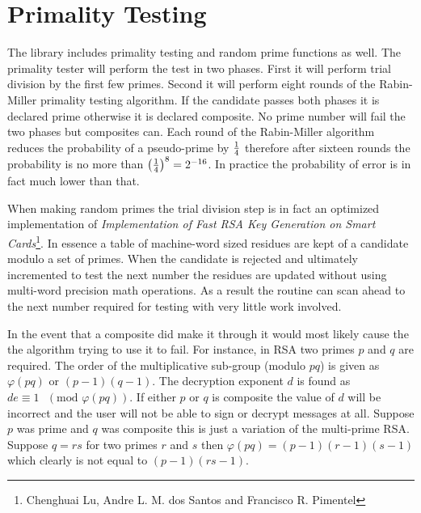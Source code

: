 \documentclass[synpaper]{book}
\def\phi{\varphi}
\newcommand{\mysection}[1]    %
	{                   %
	\section{#1}
   \markboth{\textsf{www.libtom.org}}{\thesection ~ {#1}}
	}
\begin{document}
\mysection{Primality Testing}
The library includes primality testing and random prime functions as well.  The primality tester will perform the test in
two phases.  First it will perform trial division by the first few primes.  Second it will perform eight rounds of the
Rabin-Miller primality testing algorithm.  If the candidate passes both phases it is declared prime otherwise it is declared
composite.  No prime number will fail the two phases but composites can.  Each round of the Rabin-Miller algorithm reduces
the probability of a pseudo-prime by $1 \over 4$ therefore after sixteen rounds the probability is no more than
$\left ( { 1 \over 4 } \right )^{8} = 2^{-16}$.  In practice the probability of error is in fact much lower than that.

When making random primes the trial division step is in fact an optimized implementation of \textit{Implementation of Fast RSA Key Generation on Smart Cards}\footnote{Chenghuai Lu, Andre L. M. dos Santos and Francisco R. Pimentel}.
In essence a table of machine-word sized residues are kept of a candidate modulo a set of primes.  When the candidate
is rejected and ultimately incremented to test the next number the residues are updated without using multi-word precision
math operations.  As a result the routine can scan ahead to the next number required for testing with very little work
involved.

In the event that a composite did make it through it would most likely cause the the algorithm trying to use it to fail.  For
instance, in RSA two primes $p$ and $q$ are required.  The order of the multiplicative sub-group (modulo $pq$) is given
as $\phi(pq)$ or $(p - 1)(q - 1)$.  The decryption exponent $d$ is found as $de \equiv 1\mbox{ }(\mbox{mod } \phi(pq))$.  If either $p$ or $q$ is composite the value of $d$ will be incorrect and the user
will not be able to sign or decrypt messages at all.  Suppose $p$ was prime and $q$ was composite this is just a variation of
the multi-prime RSA.  Suppose $q = rs$ for two primes $r$ and $s$ then $\phi(pq) = (p - 1)(r - 1)(s - 1)$ which clearly is
not equal to $(p - 1)(rs - 1)$.
\end{document}
